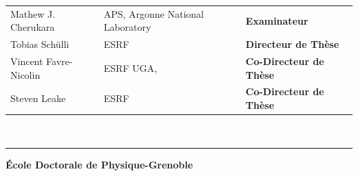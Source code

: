 \documentclass[12pt]{book}
\begin{document}
\begin{titlepage}
\begin{center}
\begin{tabular}{lll}
		Mathew J. Cherukara & APS, Argonne National Laboratory & \textbf{Examinateur} \\
		
		Tobias Sch\"ulli &  ESRF & \textbf{Directeur de Thèse}\\
		Vincent Favre-Nicolin &  ESRF UGA, & \textbf{Co-Directeur de Thèse}\\
		Steven Leake &  ESRF & \textbf{Co-Directeur de Thèse}

	\end{tabular}\\[1cm]
\end{center}
\hrule

{\small \bfseries
École Doctorale de Physique-Grenoble}

\newpage
\end{titlepage}



\pagestyle{fancy}

\fancyhead{}

\renewcommand{\chaptermark}[1]{\markboth{\textsc{#1}}{}}

\frontmatter



%
%


\tableofcontents
\clearpage





\setlength{\parskip}{.7em}

\titlespacing*{\section}{0pt}{.9em}{.8em}
\renewcommand{\baselinestretch}{1.1}



 
\end{document}
